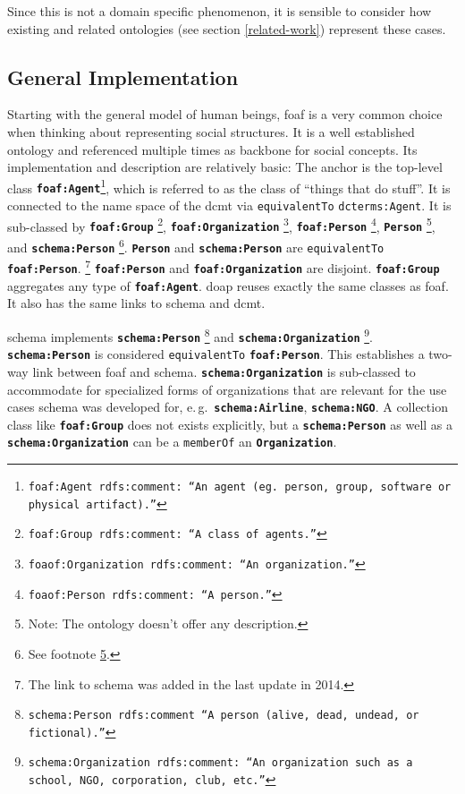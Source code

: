 \documentclass[a4paper, DIV=13, BCOR=0cm]{scrbook}
\newcommand{\eg}{e.\,g.\ }
\newcommand{\class}[1]{\texttt{\textbf{#1}}}
\newcommand{\relation}[1]{\texttt{#1}}
\newcommand{\foottt}[1]{\footnote{\texttt{#1}}}
\begin{document}
Since this is not a domain specific phenomenon, it is sensible to consider how existing and related ontologies (see section \ref{related-work}) represent these cases.

\subsection{General Implementation}
\label{human-beings-in-other-ontologies}
Starting with the general model of human beings, \gls{foaf} is a very common choice when thinking about representing social structures. It is a well established ontology and referenced multiple times as backbone for social concepts. Its implementation and description are relatively basic: The anchor is the top-level class \class{foaf:Agent}\foottt{foaf:Agent rdfs:comment: \enquote{An agent (eg. person, group, software or physical artifact).}}, which is referred to as the class of \enquote{things that do stuff}. It is connected to the name space of the \gls{dcmt} via \relation{equivalentTo} \relation{dcterms:Agent}. It is sub-classed by
%
\class{foaf:Group}%
	\foottt{foaf:Group rdfs:comment: \enquote{A class of agents.}},
%
\class{foaf:Organization}%
	\foottt{foaof:Organization rdfs:comment: \enquote{An organization.}},
%
\class{foaf:Person}%
	\foottt{foaof:Person rdfs:comment: \enquote{A person.}},
%
\class{Person}%
	\footnote{\label{footn:no-desc}Note: The ontology doesn't offer any description.}, and
\class{schema:Person}%
	\footnote{See footnote \ref{footn:no-desc}.}.
\class{Person} and \class{schema:Person} are \relation{equivalentTo} \class{foaf:Person}.%
	\footnote{The link to \gls{schema} was added in the last update in 2014.} \class{foaf:Person} and \class{foaf:Organization} are disjoint. \class{foaf:Group} aggregates any type of \class{foaf:Agent}. \gls{doap} reuses exactly the same classes as \gls{foaf}. It also has the same links to \gls{schema} and \gls{dcmt}.

\gls{schema} implements
\class{schema:Person}%
	\foottt{schema:Person rdfs:comment \enquote{A person (alive, dead, undead, or fictional).}} and
%
\class{schema:Organization}%
	\foottt{schema:Organization rdfs:comment: \enquote{An organization such as a school, NGO, corporation, club, etc.}}.
%
\class{schema:Person} is considered \relation{equivalentTo} \class{foaf:Person}. This establishes a two-way link between \gls{foaf} and \gls{schema}. \class{schema:Organization} is sub-classed to accommodate for specialized forms of organizations that are relevant for the use cases schema was developed for, \eg \class{schema:Airline}, \class{schema:NGO}. A collection class like \class{foaf:Group} does not exists explicitly, but a \class{schema:Person} as well as a \class{schema:Organization} can be a \relation{memberOf} an \class{Organization}.
\end{document}
